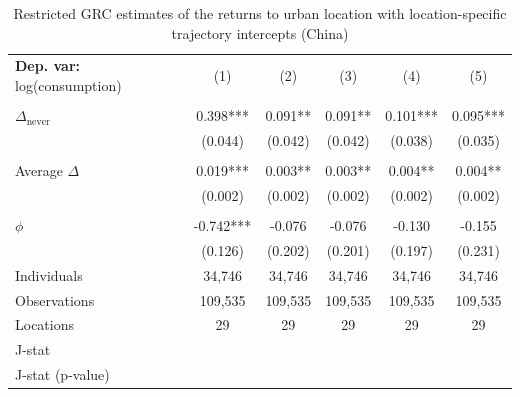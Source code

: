 \begin{table}[htbp] \centering \begin{threeparttable}
 \caption{Restricted GRC estimates of the returns to urban location with location-specific trajectory intercepts (China)} 
 \label{tab:verdier_robust_onestep_CHN_consumption_urban_unb} 
\begin{tabular}{l ccccc} \toprule  \textbf{Dep. var:}  log(consumption) 
                    &\multicolumn{1}{c}{(1)}   &\multicolumn{1}{c}{(2)}   &\multicolumn{1}{c}{(3)}   &\multicolumn{1}{c}{(4)}   &\multicolumn{1}{c}{(5)}   \\
                    &               &               &               &               &               \\
\addlinespace
$\Delta_{\text{never}}$&       0.398***&       0.091** &       0.091** &       0.101***&       0.095***\\
                    &     (0.044)   &     (0.042)   &     (0.042)   &     (0.038)   &     (0.035)   \\
                    &               &               &               &               &               \\
\addlinespace
Average $\Delta$    &       0.019***&       0.003** &       0.003** &       0.004** &       0.004** \\
                    &     (0.002)   &     (0.002)   &     (0.002)   &     (0.002)   &     (0.002)   \\
                    &               &               &               &               &               \\
\addlinespace
$\phi$              &      -0.742***&      -0.076   &      -0.076   &      -0.130   &      -0.155   \\
                    &     (0.126)   &     (0.202)   &     (0.201)   &     (0.197)   &     (0.231)   \\
\addlinespace
Individuals         &      34,746   &      34,746   &      34,746   &      34,746   &      34,746   \\
Observations        &     109,535   &     109,535   &     109,535   &     109,535   &     109,535   \\
Locations           &          29   &          29   &          29   &          29   &          29   \\
J-stat              &               &               &               &               &               \\
J-stat (p-value)    &               &               &               &               &               \\

\end{tabular}
\end{threeparttable}
\end{table}
